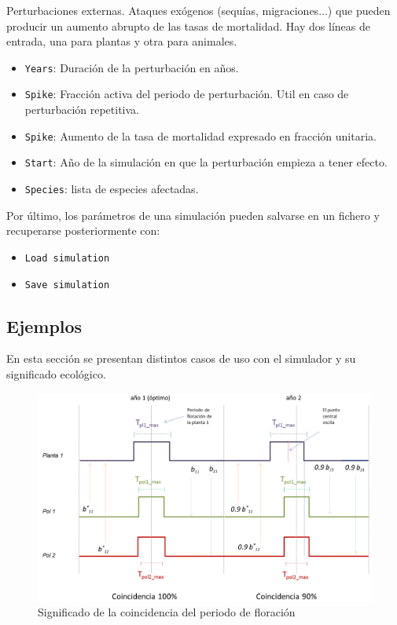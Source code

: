 Perturbaciones externas. Ataques exógenos (sequías, migraciones...) que pueden producir un aumento abrupto de las tasas
de mortalidad. Hay dos líneas de entrada, una para plantas y otra para animales.

\begin{itemize}
 \item \texttt{Years}: Duración de la perturbación en años.
 \item \texttt{Spike}: Fracción activa del periodo de perturbación. Util en caso de perturbación repetitiva.
 \item \texttt{Spike}: Aumento de la tasa de mortalidad expresado en fracción unitaria.
 \item \texttt{Start}: Año de la simulación en que la perturbación empieza a tener efecto.
 \item \texttt{Species}: lista de especies afectadas.
\end{itemize}

Por último, los parámetros de una simulación pueden salvarse en un fichero y recuperarse posteriormente con:
\begin{itemize}
 \item \texttt{Load simulation}
 \item \texttt{Save simulation}
\end{itemize}

\subsection{Ejemplos}

En esta sección se presentan distintos casos de uso con el simulador y su significado ecológico.

\begin{figure}[h!]
\centering
\includegraphics[scale=1]{ManFigs/sigmund_tiempos.png}
\caption{Significado de la coincidencia del periodo de floración}
\label{fig:ASIGMUNDMAN_sigmund_tiempos}
\end{figure}

